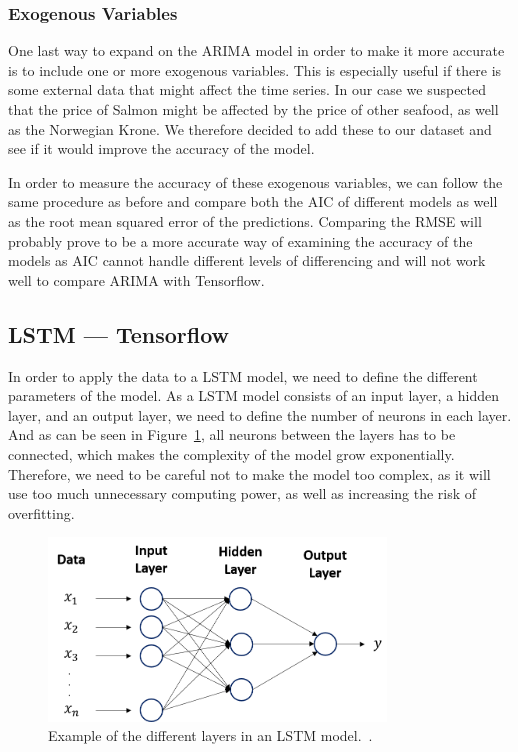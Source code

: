 \subsubsection{Exogenous Variables}
One last way to expand on the ARIMA model in order to make it more accurate is to include one or more exogenous variables. This is especially useful if there is some external data that might affect the time series. In our case we suspected that the price of Salmon might be affected by the price of other seafood, as well as the Norwegian Krone. We therefore decided to add these to our dataset and see if it would improve the accuracy of the model.

In order to measure the accuracy of these exogenous variables, we can follow the same procedure as before and compare both the AIC of different models as well as the root mean squared error of the predictions. Comparing the RMSE will probably prove to be a more accurate way of examining the accuracy of the models as AIC cannot handle different levels of differencing and will not work well to compare ARIMA with Tensorflow.~\parencite{brownlee_2017}
\subsection{LSTM --- Tensorflow}\label{Tensorflow_Methodology}
In order to apply the data to a LSTM model, we need to define the different parameters of the model. As a LSTM model consists of an input layer, a hidden layer, and an output layer, we need to define the number of neurons in each layer. And as can be seen in Figure~\ref{fig:Layers}, all neurons between the layers has to be connected, which makes the complexity of the model grow exponentially. Therefore, we need to be careful not to make the model too complex, as it will use too much unnecessary computing power, as well as increasing the risk of overfitting.

\begin{figure}[H]
    \centering
    \includegraphics[width=0.8\textwidth]{data/Figures/Neural networks/Layers_lstm.png}
    \caption[Example of the different layers in an LSTM model.]{Example of the different layers in an LSTM model.~\cite{towardsai_2020_1}.}\label{fig:Layers}
\end{figure}

